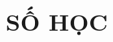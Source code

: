 \documentclass[12pt,a4paper,oneside]{book}
\theoremstyle{nonumberplain}
\begin{document}
\part{SỐ HỌC}
%
%
%
%

%
%
%
%
%
%
%
%
%
%
%
%
%
%
%
%
%
%
%
%
%
%
%
%
%
\end{document}
